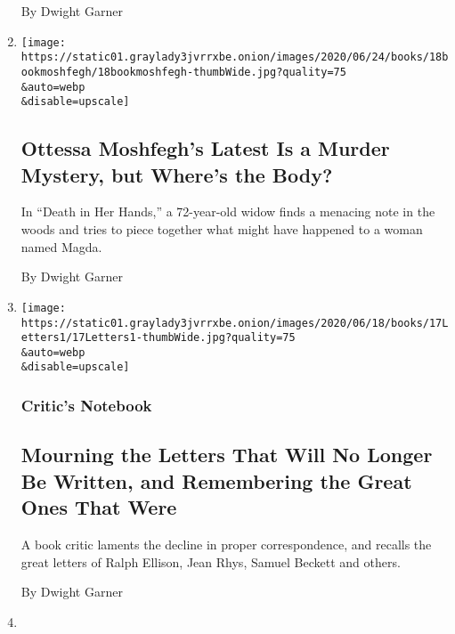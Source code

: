\begin{enumerate}
  By Dwight Garner
\item
  \href{/2020/06/19/books/review-death-in-her-hands-ottessa-moshfegh.html}{}

  \texttt{[image: https://static01.graylady3jvrrxbe.onion/images/2020/06/24/books/18bookmoshfegh/18bookmoshfegh-thumbWide.jpg?quality=75\\\&auto=webp\\\&disable=upscale]}

  \hypertarget{ottessa-moshfeghs-latest-is-a-murder-mystery-but-wheres-the-body}{%
  \subsection{Ottessa Moshfegh's Latest Is a Murder Mystery, but Where's
  the
  Body?}\label{ottessa-moshfeghs-latest-is-a-murder-mystery-but-wheres-the-body}}

  In ``Death in Her Hands,'' a 72-year-old widow finds a menacing note
  in the woods and tries to piece together what might have happened to a
  woman named Magda.

  By Dwight Garner
\item
  \href{/2020/06/17/books/art-of-writing-letters.html}{}

  \texttt{[image: https://static01.graylady3jvrrxbe.onion/images/2020/06/18/books/17Letters1/17Letters1-thumbWide.jpg?quality=75\\\&auto=webp\\\&disable=upscale]}

  \hypertarget{critics-notebook}{%
  \subsubsection{Critic's Notebook}\label{critics-notebook}}

  \hypertarget{mourning-the-letters-that-will-no-longer-be-written-and-remembering-the-great-ones-that-were}{%
  \subsection{Mourning the Letters That Will No Longer Be Written, and
  Remembering the Great Ones That
  Were}\label{mourning-the-letters-that-will-no-longer-be-written-and-remembering-the-great-ones-that-were}}

  A book critic laments the decline in proper correspondence, and
  recalls the great letters of Ralph Ellison, Jean Rhys, Samuel Beckett
  and others.

  By Dwight Garner
\item
  \href{/2020/06/14/books/review-art-of-her-deal-melania-trump-mary-jordan.html}{}


\end{enumerate}
